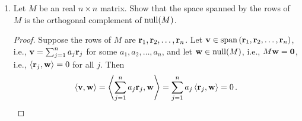 \documentclass[11pt]{amsart}
\begin{document}
\begin{enumerate}[(1)]
\begin{proof}
\begin{align*}
  &\qquad \qquad + \tfrac 1 2 \left( \norm{ a \, \v_1 + \v_2 - 2 \w }^2 - \norm{ a \, \v_1 + \v_2 + 2 \w }^2 \right) \\
  &\qquad = \tfrac 1 2 \left( \norm{ a \, \v_1 + \v_2 + 2 \w }^2 + \norm{ a \, \v_1 + \v_2 }^2 \right) - \tfrac 1 2 \left( \norm{ a \, \v_1 + \v_2 }^2 + \norm{ a \, \v_1 + \v_2 - 2 \w }^2 \right) \\
  &\qquad \qquad + \tfrac 1 2 \left( \norm{ a \, \v_1 + \v_2 - 2 \w }^2 - \norm{ a \, \v_1 + \v_2 + 2 \w }^2 \right) \\
  &\qquad = 0 \, .
\end{align*}
(In the penultimate equation, we have used the ``parallelogram equality" once more, again read from right to left.)
Third,
\[
  \inner \v \w
  = \tfrac 1 4 \left( \norm{ \v + \w }^2 - \norm{ \v - \w }^2 \right)
  = \tfrac 1 4 \left( \norm{ \w + \v }^2 - \norm{ \w - \v }^2 \right)
  = \inner \w \v \, ,
\]
and this finishes our proof that $\inner \v \w$ is an inner product.
\end{proof}

\item Let $M$ be an real $n \times n$ matrix. Show that the space spanned by the rows of $M$ is the orthogonal complement of $\operatorname{null}(M)$.

\begin{proof}
Suppose the rows of $M$ are $\mathbf r_1, \mathbf r_2, \dots, \mathbf r_n$.
Let $\mathbf v \in \operatorname{span} \left( \mathbf r_1, \mathbf r_2, \dots, \mathbf r_n \right)$, i.e., $\mathbf v = \sum_{ j=1 }^{ n } a_j \mathbf r_j$ for some $a_1, a_2, \dots, a_n$, and let $\mathbf w \in \operatorname{null}(M)$, i.e., $M \mathbf w = \mathbf 0$, i.e., $\left< \mathbf r_j, \mathbf w \right> = 0$ for all $j$. Then
\[
  \left< \mathbf v, \mathbf w \right>
  = \left<  \sum_{ j=1 }^{ n } a_j \mathbf r_j , \mathbf w \right>
  = \sum_{ j=1 }^{ n } a_j \left< \mathbf r_j, \mathbf w \right> = 0 \, . \qedhere
\]
\end{proof}

\end{enumerate}
\end{document}
